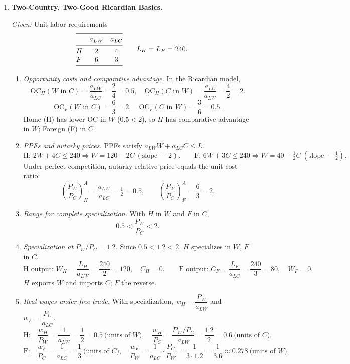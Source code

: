 \documentclass[11pt]{article}
\begin{document}
\begin{enumerate}[leftmargin=*, resume]
\item \textbf{Two-Country, Two-Good Ricardian Basics.}

\emph{Given:} Unit labor requirements
\[
\begin{array}{@{}lcc@{}}
\toprule
 & a_{LW} & a_{LC}\\
\midrule
H & 2 & 4\\
F & 6 & 3\\
\bottomrule
\end{array}
\qquad L_H=L_F=240.
\]

\begin{enumerate}
\item \emph{Opportunity costs and comparative advantage.} In the Ricardian model,
\[
\text{OC}_H(W \text{ in } C)=\frac{a_{LW}}{a_{LC}}=\frac{2}{4}=0.5,\quad
\text{OC}_H(C \text{ in } W)=\frac{a_{LC}}{a_{LW}}=\frac{4}{2}=2.
\]
\[
\text{OC}_F(W \text{ in } C)=\frac{6}{3}=2,\quad
\text{OC}_F(C \text{ in } W)=\frac{3}{6}=0.5.
\]
Home (H) has lower OC in $W$ ($0.5<2$), so $H$ has comparative advantage in $W$; Foreign (F) in $C$.

\item \emph{PPFs and autarky prices.} PPFs satisfy $a_{LW}W+a_{LC}C\le L$.
\[
\text{H: } 2W+4C\le 240 \Rightarrow W=120-2C\ (\text{slope }-2).
\qquad
\text{F: } 6W+3C\le 240 \Rightarrow W=40-\tfrac{1}{2}C\ (\text{slope }-\tfrac{1}{2}).
\]
Under perfect competition, autarky relative price equals the unit-cost ratio:
\[
\left(\frac{P_W}{P_C}\right)^{A}_H=\frac{a_{LW}}{a_{LC}}=\tfrac{1}{2}=0.5,
\qquad
\left(\frac{P_W}{P_C}\right)^{A}_F=\frac{6}{3}=2.
\]

\item \emph{Range for complete specialization.} With $H$ in $W$ and $F$ in $C$,
\[
0.5 < \frac{P_W}{P_C} < 2.
\]

\item \emph{Specialization at $P_W/P_C=1.2$.} Since $0.5<1.2<2$, $H$ specializes in $W$, $F$ in $C$.
\[
\text{H output: } W_H=\frac{L_H}{a_{LW}}=\frac{240}{2}=120,\quad C_H=0.
\qquad
\text{F output: } C_F=\frac{L_F}{a_{LC}}=\frac{240}{3}=80,\quad W_F=0.
\]
$H$ exports $W$ and imports $C$; $F$ the reverse.

\item \emph{Real wages under free trade.} With specialization, $w_H=\dfrac{P_W}{a_{LW}}$ and $w_F=\dfrac{P_C}{a_{LC}}$.
\[
\text{H:}\quad \frac{w_H}{P_W}=\frac{1}{a_{LW}}=\frac{1}{2}=0.5\ \text{(units of $W$)},\quad
\frac{w_H}{P_C}=\frac{P_W/P_C}{a_{LW}}=\frac{1.2}{2}=0.6\ \text{(units of $C$)}.
\]
\[
\text{F:}\quad \frac{w_F}{P_C}=\frac{1}{a_{LC}}=\frac{1}{3}\ \text{(units of $C$)},\quad
\frac{w_F}{P_W}=\frac{1}{a_{LC}}\cdot\frac{P_C}{P_W}=\frac{1}{3\cdot 1.2}=\frac{1}{3.6}\approx 0.278\ \text{(units of $W$)}.
\]
\end{enumerate}




\end{enumerate}
\end{document}
